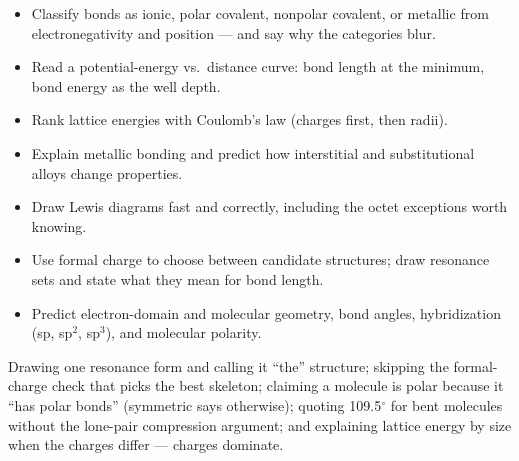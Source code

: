 \documentclass{apchem-worksheet}
\begin{document}
\begin{itemize}[leftmargin=*,itemsep=0.15em]
  \item Classify bonds as ionic, polar covalent, nonpolar covalent, or
        metallic from electronegativity and position --- and say why the
        categories blur. 
  \item Read a potential-energy vs.\ distance curve: bond length at the
        minimum, bond energy as the well depth. 
  \item Rank lattice energies with Coulomb's law (charges first, then
        radii). 
  \item Explain metallic bonding and predict how interstitial and
        substitutional alloys change properties. 
  \item Draw Lewis diagrams fast and correctly, including the octet
        exceptions worth knowing. 
  \item Use formal charge to choose between candidate structures; draw
        resonance sets and state what they mean for bond length. 
  \item Predict electron-domain and molecular geometry, bond angles,
        hybridization (sp, sp$^2$, sp$^3$), and molecular polarity. 
\end{itemize}

\begin{apctrap}
Drawing one resonance form and calling it ``the'' structure; skipping the
formal-charge check that picks the best skeleton; claiming a molecule is
polar because it ``has polar bonds'' (symmetric  says otherwise);
quoting 109.5$^\circ$ for bent molecules without the lone-pair compression
argument; and explaining lattice energy by size when the charges differ ---
charges dominate.
\end{apctrap}
\end{document}
